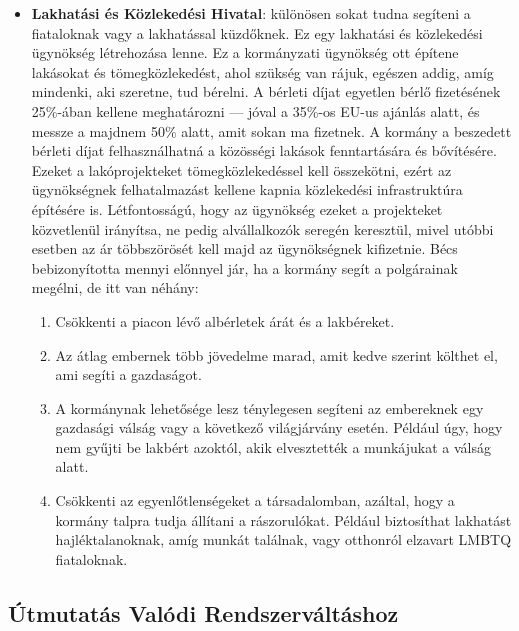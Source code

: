 \begin{itemize}
	\item \textbf{Lakhatási és Közlekedési Hivatal}: különösen sokat tudna segíteni a fiataloknak
	      vagy a lakhatással küzdőknek. Ez egy lakhatási és közlekedési ügynökség létrehozása lenne. Ez
	      a kormányzati ügynökség ott építene lakásokat és tömegközlekedést, ahol szükség van rájuk, egészen
	      addig, amíg mindenki, aki szeretne, tud bérelni. A bérleti díjat egyetlen bérlő fizetésének 25\%-ában
	      kellene meghatározni --- jóval a 35\%-os EU-us ajánlás alatt, és messze a majdnem 50\% alatt, amit
	      sokan ma fizetnek. A kormány a beszedett bérleti díjat felhasználhatná a közösségi lakások fenntartására
	      és bővítésére. Ezeket a lakóprojekteket tömegközlekedéssel kell összekötni, ezért az ügynökségnek
	      felhatalmazást kellene kapnia közlekedési infrastruktúra építésére is. Létfontosságú, hogy az ügynökség
	      ezeket a projekteket közvetlenül irányítsa, ne pedig alvállalkozók seregén keresztül, mivel utóbbi esetben
	      az ár többszörösét kell majd az ügynökségnek kifizetnie. Bécs bebizonyította mennyi előnnyel jár, ha a
	      kormány segít a polgárainak megélni, de itt van néhány:
	      \begin{enumerate}
		      \item Csökkenti a piacon lévő albérletek árát és a lakbéreket.

		      \item Az átlag embernek több jövedelme marad, amit kedve szerint költhet el, ami segíti a gazdaságot.

		      \item A kormánynak lehetősége lesz ténylegesen segíteni az embereknek egy gazdasági válság vagy a
		            következő világjárvány esetén. Például úgy, hogy nem gyűjti be lakbért azoktól, akik elvesztették
		            a munkájukat a válság alatt.

		      \item Csökkenti az egyenlőtlenségeket a társadalomban, azáltal, hogy a kormány talpra tudja állítani
		            a rászorulókat. Például biztosíthat lakhatást hajléktalanoknak, amíg munkát találnak, vagy otthonról
		            elzavart LMBTQ fiataloknak.
	      \end{enumerate}
\end{itemize}

\subsection{Útmutatás Valódi Rendszerváltáshoz}

